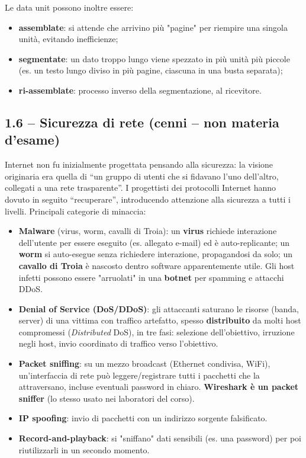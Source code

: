 \documentclass[12pt, a4paper]{article}
\begin{document}
Le data unit possono inoltre essere:
\begin{itemize}
    \item \textbf{assemblate}: si attende che arrivino più "pagine" per riempire una singola unità, evitando inefficienze;
    \item \textbf{segmentate}: un dato troppo lungo viene spezzato in più unità più piccole (es. un testo lungo diviso in più pagine, ciascuna in una busta separata);
    \item \textbf{ri-assemblate}: processo inverso della segmentazione, al ricevitore.
\end{itemize}

\subsection{1.6 -- Sicurezza di rete (cenni -- non materia d'esame)}

Internet non fu inizialmente progettata pensando alla sicurezza: la visione originaria era quella di ``un gruppo di utenti che si fidavano l'uno dell'altro, collegati a una rete trasparente''. I progettisti dei protocolli Internet hanno dovuto in seguito ``recuperare'', introducendo attenzione alla sicurezza a tutti i livelli. Principali categorie di minaccia:

\begin{itemize}
    \item \textbf{Malware} (virus, worm, cavalli di Troia): un \textbf{virus} richiede interazione dell'utente per essere eseguito (es. allegato e-mail) ed è auto-replicante; un \textbf{worm} si auto-esegue senza richiedere interazione, propagandosi da solo; un \textbf{cavallo di Troia} è nascosto dentro software apparentemente utile. Gli host infetti possono essere "arruolati" in una \textbf{botnet} per spamming e attacchi DDoS.
    \item \textbf{Denial of Service (DoS/DDoS)}: gli attaccanti saturano le risorse (banda, server) di una vittima con traffico artefatto, spesso \textbf{distribuito} da molti host compromessi (\textit{Distributed} DoS), in tre fasi: selezione dell'obiettivo, irruzione negli host, invio coordinato di traffico verso l'obiettivo.
    \item \textbf{Packet sniffing}: su un mezzo broadcast (Ethernet condivisa, WiFi), un'interfaccia di rete può leggere/registrare tutti i pacchetti che la attraversano, incluse eventuali password in chiaro. \textbf{Wireshark è un packet sniffer} (lo stesso usato nei laboratori del corso).
    \item \textbf{IP spoofing}: invio di pacchetti con un indirizzo sorgente falsificato.
    \item \textbf{Record-and-playback}: si "sniffano" dati sensibili (es. una password) per poi riutilizzarli in un secondo momento.
\end{itemize}
\end{document}

